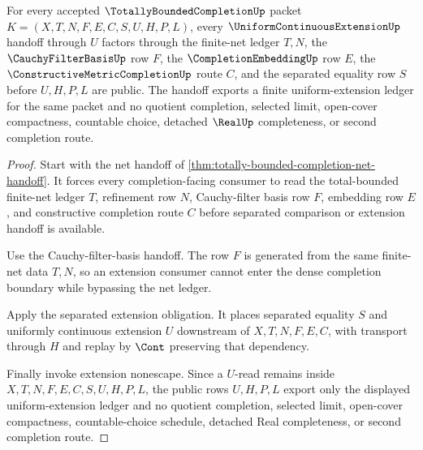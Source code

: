 \begin{theorem}
\label{thm:totally-bounded-completion-uniform-extension-ledger}
For every accepted $\TotallyBoundedCompletionUp$ packet $K=(X,T,N,F,E,C,S,U,H,P,L)$, every $\UniformContinuousExtensionUp$ handoff through $U$ factors through the finite-net ledger $T,N$, the $\CauchyFilterBasisUp$ row $F$, the $\CompletionEmbeddingUp$ row $E$, the $\ConstructiveMetricCompletionUp$ route $C$, and the separated equality row $S$ before $U,H,P,L$ are public. The handoff exports a finite uniform-extension ledger for the same packet and no quotient completion, selected limit, open-cover compactness, countable choice, detached $\RealUp$ completeness, or second completion route.
\end{theorem}
\begin{proof}
Start with the net handoff of \autoref{thm:totally-bounded-completion-net-handoff}. It forces every completion-facing consumer to read the total-bounded finite-net ledger $T$, refinement row $N$, Cauchy-filter basis row $F$, embedding row $E$, and constructive completion route $C$ before separated comparison or extension handoff is available.

Use the Cauchy-filter-basis handoff. The row $F$ is generated from the same finite-net data $T,N$, so an extension consumer cannot enter the dense completion boundary while bypassing the net ledger.

Apply the separated extension obligation. It places separated equality $S$ and uniformly continuous extension $U$ downstream of $X,T,N,F,E,C$, with transport through $H$ and replay by $\Cont$ preserving that dependency.

Finally invoke extension nonescape. Since a $U$-read remains inside $X,T,N,F,E,C,S,U,H,P,L$, the public rows $U,H,P,L$ export only the displayed uniform-extension ledger and no quotient completion, selected limit, open-cover compactness, countable-choice schedule, detached Real completeness, or second completion route.
\end{proof}

